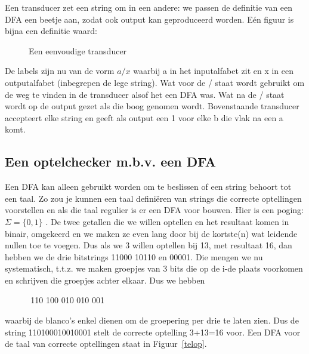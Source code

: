 Een transducer zet een string om in een andere: we passen de definitie
van een DFA een beetje aan, zodat ook output kan geproduceerd worden.
E\'{e}n figuur is bijna een definitie waard:

\begin{figure}[h]
\caption{Een eenvoudige transducer \label{trans1}}
\end{figure}

De labels zijn nu van de vorm $a/x$ waarbij a in het inputalfabet zit
en x in een outputalfabet (inbegrepen de lege string). Wat voor de /
staat wordt gebruikt om de weg te vinden in de transducer alsof het
een DFA was. Wat na de / staat wordt op de output gezet als die boog
genomen wordt. Bovenstaande transducer accepteert elke string en
geeft als output een 1 voor elke b die vlak na een a komt.



\subsection{Een optelchecker m.b.v. een DFA}

Een DFA kan alleen gebruikt worden om te beslissen of een string
behoort tot een taal. Zo zou je kunnen een taal defini\"eren van strings
die correcte optellingen voorstellen en als die taal regulier is er
een DFA voor bouwen. Hier is een poging: $\Sigma = \{0,1\}$ . De twee
getallen die we willen optellen en het resultaat komen in binair,
omgekeerd en we maken ze even lang door bij de kortste(n) wat leidende
nullen toe te voegen. Dus als we 3 willen optellen bij 13, met
resultaat 16, dan hebben we de drie bitstrings 11000 10110 en
00001. Die mengen we nu systematisch, t.t.z. we maken groepjes van 3
bits die op de i-de plaats voorkomen en schrijven die groepjes achter
elkaar. Dus we hebben

$~~~~~~~~~~~~~~$110 100 010 010 001

waarbij de blanco's enkel dienen om de groepering per drie te laten
zien. Dus de string 110100010010001 stelt de correcte optelling 
3+13=16 voor. Een DFA voor de taal van correcte optellingen staat in
Figuur~\ref{telop}.


